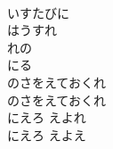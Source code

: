 \documentclass[10pt,b5j]{tarticle} %
\begin{document}
\begin{enumerate}
\begin{minipage}[c]{\blocksize}
        \vspace{\linespace}
        \item~\\
        いすたびに\\
        はうすれ\\
        れの\\
        にる\\
        のさをえておくれ\\
        のさをえておくれ\\
        にえろ
        えよれ\\
        にえろ
        えよえ
    
    \end{minipage}
\end{enumerate} %
\end{document}
